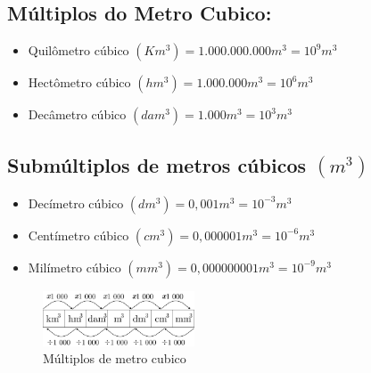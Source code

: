 \subsection{Múltiplos do Metro Cubico:}
		\begin{itemize}
		    \item Quilômetro cúbico $(Km^3) = 1.000.000.000 m^3 = 10^9 m^3$
		    \item Hectômetro cúbico $(hm^3) = 1.000.000 m^3 = 10^6 m^3$
		    \item Decâmetro cúbico $(dam^3) = 1.000 m^3 = 10^3 m^3$
		\end{itemize}
	
\subsection{Submúltiplos de metros cúbicos $(m^3)$}
		\begin{itemize}
		    \item Decímetro cúbico $(dm^3) = 0,001 m^3 = 10^{-3} m^3$
		    \item Centímetro cúbico $(cm^3) = 0,000001 m^3 = 10^{-6} m^3$
		    \item Milímetro cúbico $(mm^3) = 0,000000001 m^3 = 10^{-9} m^3$
		\end{itemize}
		
		\begin{figure}
		    \centering 
            \includegraphics[width=0.4\textwidth]{imagens/matematicaBasica/sistemaDeUnidades/MultiplosDeMetroCubico.pdf}
		    \caption{Múltiplos de metro cubico}
		\end{figure}
     
